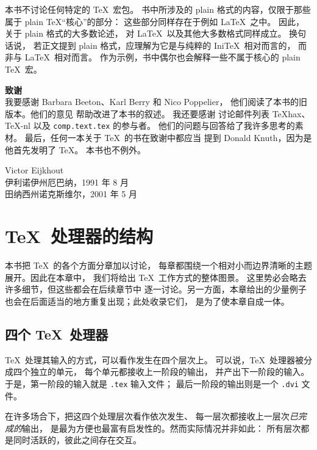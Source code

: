 \documentclass[a4paper]{rapport3}
\def\nl{\protect\\}\def\n#1{{\tt #1}}\def\cs#1{{\tt\char`\\#1}}\let\csc\cs
\def\IniTeX{Ini\TeX}\def\LamsTeX{LAMS\TeX}\def\VirTeX{Vir\TeX}
\begin{document}
本书不讨论任何特定的 \TeX\ 宏包。
书中所涉及的 plain 格式的内容，仅限于那些
属于 plain \TeX“核心”的部分：
这些部分同样存在于例如 \LaTeX\ 之中。
因此，关于 plain 格式的大多数论述，
对 \LaTeX\ 以及其他大多数格式同样成立。
换句话说，
若正文提到 plain 格式，应理解为它是与纯粹的 \IniTeX\ 相对而言的，
而非与 \LaTeX\ 相对而言。
作为示例，书中偶尔也会解释一些不属于核心的 plain \TeX\ 宏。

\medskip\noindent
{\bf 致谢}\nl
我要感谢 Barbara Beeton、Karl Berry 和 Nico Poppelier，
他们阅读了本书的旧版本。他们的意见
帮助改进了本书的叙述。
我还要感谢
讨论邮件列表 \TeX hax、\TeX-nl 以及 {\tt comp.text.tex} 的参与者。
他们的问题与回答给了我许多思考的素材。
最后，任何一本关于 \TeX\ 的书在致谢中都应当
提到 Donald Knuth，因为是他首先发明了 \TeX。
本书也不例外。

\begin{flushright}
 Victor Eijkhout\\
 伊利诺伊州厄巴纳，1991 年 8 月\\
 田纳西州诺克斯维尔，2001 年 5 月
\end{flushright}
\pagebreak

\chapter{\TeX\ 处理器的结构}

本书把 \TeX\ 的各个方面分章加以讨论，
每章都围绕一个相对小而边界清晰的主题展开。因此在本章中，
我们将给出 \TeX\ 工作方式的整体图景。
这里势必会略去许多细节，但这些都会在后续章节中
逐一讨论。另一方面，本章给出的少量例子
也会在后面适当的地方重复出现；此处收录它们，
是为了使本章自成一体。

\section{四个 \TeX\protect\ 处理器}

\TeX\ 处理其输入的方式，可以看作发生在四个层次上。
可以说，\TeX\ 处理器被分成四个独立的单元，
每个单元都接收上一阶段的输出，
并产出下一阶段的输入。
于是，第一阶段的输入就是 \n{.tex} 输入文件；
最后一阶段的输出则是一个 \n{.dvi} 文件。

在许多场合下，把这四个处理层次看作依次发生、
每一层次都接收上一层次{\em 已完成的\/}输出，
是最为方便也最富有启发性的。然而实际情况并非如此：
所有层次都是同时活跃的，彼此之间存在交互。
\end{document}
